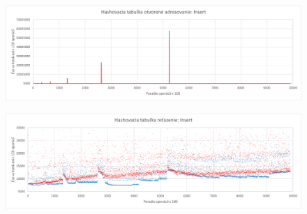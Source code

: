 \documentclass[a4paper,slovak,12pt]{article}
\begin{document}
    \begin{figure}[!htbp]
        \centering
        \label{fig:figure5}
        \includegraphics[width=\textwidth]{HashSC_Insert}
    \end{figure}
    \begin{figure}[!htbp]
        \centering
        \label{fig:figure6}
        \includegraphics[width=\textwidth]{HashSC_Insert_zoomed}
    \end{figure}

    \FloatBarrier


    \newpage

    

    \newpage
\end{document}
